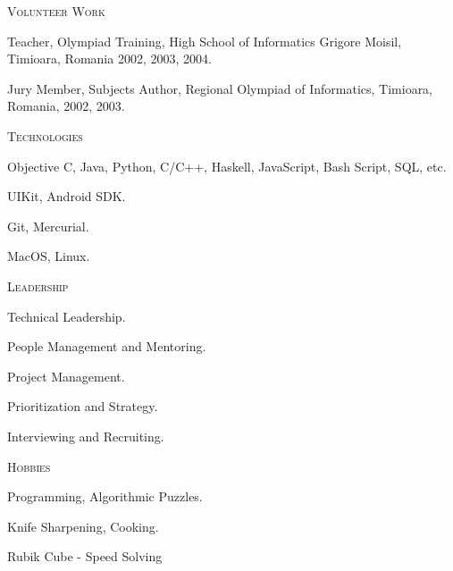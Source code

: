 \documentclass[10pt]{article}
\begin{document}
\vspace{0.16in}

\noindent
\textcolor{Primary}{{\large \textsc{Volunteer Work}}}
\begin{list}{}{\leftmargin=0em}
  \setlength{\itemsep}{1pt}
  \setlength{\parskip}{0pt}
  \setlength{\parsep}{0pt}
  \item{Teacher, Olympiad Training, High School of Informatics Grigore Moisil, Timioara, Romania 2002, 2003, 2004.}
  \item{Jury Member, Subjects Author, Regional Olympiad of Informatics, Timioara, Romania, 2002, 2003.}
\end{list}

\vspace{0.16in}

\noindent
\textcolor{Primary}{{\large \textsc{Technologies}}}
\begin{list}{}{\leftmargin=0em}
  \setlength{\itemsep}{1pt}
  \setlength{\parskip}{0pt}
  \setlength{\parsep}{0pt}
  \item{Objective C, Java, Python, C/C++, Haskell, JavaScript, Bash Script, SQL, etc.}
  \item{UIKit, Android SDK.}
  \item{Git, Mercurial.}
  \item{MacOS, Linux.}
\end{list}

\vspace{0.16in}

\noindent
\textcolor{Primary}{{\large \textsc{Leadership}}}
\begin{list}{}{\leftmargin=0em}
  \setlength{\itemsep}{1pt}
  \setlength{\parskip}{0pt}
  \setlength{\parsep}{0pt}
  \item{Technical Leadership.}
  \item{People Management and Mentoring.}
  \item{Project Management.}
  \item{Prioritization and Strategy.}
  \item{Interviewing and Recruiting.}
\end{list}

\vspace{0.16in}

\noindent
\textcolor{Primary}{{\large \textsc{Hobbies}}}
\begin{list}{}{\leftmargin=0em}
  \setlength{\itemsep}{1pt}
  \setlength{\parskip}{0pt}
  \setlength{\parsep}{0pt}
  \item{Programming, Algorithmic Puzzles.}
  \item{Knife Sharpening, Cooking.}
  \item{Rubik Cube - Speed Solving}
\end{list}
\end{document}
